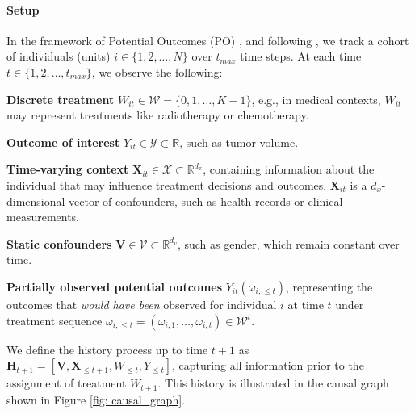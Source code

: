 \documentclass{article}
\theoremstyle{plain}
\theoremstyle{definition}
\theoremstyle{remark}
\begin{document}
\paragraph{Setup} In the framework of Potential Outcomes (PO) \citep{rubin2005causal}, and following \cite{robins2009estimation}, we track a cohort of individuals (units) $i \in \{1,2,\dots, N\}$ over $t_{max}$ time steps. At each time $t \in \{1,2,\dots,t_{max}\}$, we observe the following:
\begin{inparaenum}[(1)]
    \item \textbf{Discrete treatment} $W_{it} \in \mathcal{W} = \{0,1, \dots, K-1\}$, e.g., in medical contexts, $W_{it}$ may represent treatments like radiotherapy or chemotherapy.
    \item \textbf{Outcome of interest} $Y_{it} \in \mathcal{Y} \subset \mathbb{R}$, such as tumor volume.
    \item \textbf{Time-varying context} $\mathbf{X}_{it} \in \mathcal{X} \subset \mathbb{R}^{d_x}$, containing information about the individual that may influence treatment decisions and outcomes. $\mathbf{X}_{it}$ is a $d_x$-dimensional vector of confounders, such as health records or clinical measurements.
    \item \textbf{Static confounders} $\mathbf{V} \in \mathcal{V} \subset \mathbb{R}^{d_v}$, such as gender, which remain constant over time.
    \item \textbf{Partially observed potential outcomes} $Y_{it}(\omega_{i, \leq t})$, representing the outcomes that \emph{would have been} observed for individual $i$ at time $t$ under treatment sequence $\omega_{i, \leq t} = (\omega_{i,1}, \dots, \omega_{i,t}) \in \mathcal{W}^t$.
\end{inparaenum}
We define the history process up to time $t+1$ as $\mathbf{H}_{t+1} = [\mathbf{V}, \mathbf{X}_{\leq t+1}, W_{\leq t}, Y_{\leq t}]$, capturing all information prior to the assignment of treatment $W_{t+1}$. This history is illustrated in the causal graph shown in Figure \ref{fig: causal_graph}.
\end{document}
